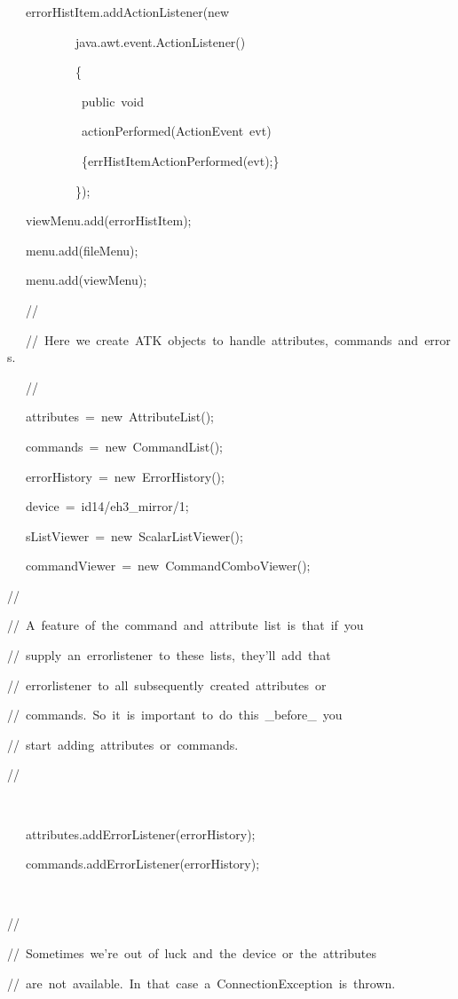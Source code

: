 \begin{lyxcode}
~~~errorHistItem.addActionListener(new~

~~~~~~~~~~~java.awt.event.ActionListener()

~~~~~~~~~~~\{~~~~~~~~~~~~~~~~~

~~~~~~~~~~~~public~void~

~~~~~~~~~~~~actionPerformed(ActionEvent~evt)

~~~~~~~~~~~~\{errHistItemActionPerformed(evt);\}

~~~~~~~~~~~\});

~~~viewMenu.add(errorHistItem);

~~~menu.add(fileMenu);

~~~menu.add(viewMenu);



~~~//

~~~//~Here~we~create~ATK~objects~to~handle~attributes,~commands~and~errors.

~~~//

~~~attributes~=~new~AttributeList();~

~~~commands~=~new~CommandList();

~~~errorHistory~=~new~ErrorHistory();

~~~device~=~\textquotedbl{}id14/eh3\_mirror/1\textquotedbl{};

~~~sListViewer~=~new~ScalarListViewer();

~~~commandViewer~=~new~CommandComboViewer();





//~

//~A~feature~of~the~command~and~attribute~list~is~that~if~you

//~supply~an~errorlistener~to~these~lists,~they'll~add~that

//~errorlistener~to~all~subsequently~created~attributes~or

//~commands.~So~it~is~important~to~do~this~\_before\_~you

//~start~adding~attributes~or~commands.

//

~

~~~attributes.addErrorListener(errorHistory);

~~~commands.addErrorListener(errorHistory);

~

//

//~Sometimes~we're~out~of~luck~and~the~device~or~the~attributes

//~are~not~available.~In~that~case~a~ConnectionException~is~thrown.


\end{lyxcode}
